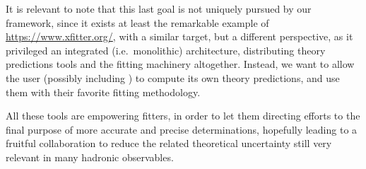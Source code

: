 It is relevant to note that this last goal is not uniquely pursued by our
framework, since it exists at least the remarkable example of \xfitter
\url{https://www.xfitter.org/}, with a similar target, but a different
perspective, as it privileged an integrated (i.e.\ monolithic) architecture,
distributing theory predictions tools and the fitting machinery altogether.
Instead, we want to allow the user (possibly including \xfitter) to compute its
own theory predictions, and use them with their favorite fitting methodology.

All these tools are empowering \pdf fitters, in order to let them directing
efforts to the final purpose of more accurate and precise determinations,
hopefully leading to a fruitful collaboration to reduce the related theoretical
uncertainty still very relevant in many hadronic observables.
